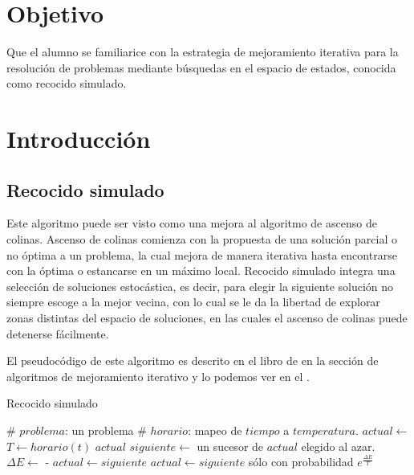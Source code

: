 \section{Objetivo}

Que el alumno se familiarice con la estrategia de mejoramiento iterativa para la resolución de problemas mediante búsquedas en el espacio de estados, conocida como recocido simulado.



\section{Introducción}

\subsection{Recocido simulado}

Este algoritmo puede ser visto como una mejora al algoritmo de ascenso de colinas.  Ascenso de colinas comienza con la propuesta de una solución parcial o no óptima a un problema, la cual mejora de manera iterativa hasta encontrarse con la óptima o estancarse en un máximo local.  Recocido simulado integra una selección de soluciones estocástica, es decir, para elegir la siguiente solución no siempre escoge a la mejor vecina, con lo cual se le da la libertad de explorar zonas distintas del espacio de soluciones, en las cuales el ascenso de colinas puede detenerse fácilmente.

El pseudocódigo de este algoritmo es descrito en el libro de  \cite{Russell2010} en la sección de algoritmos de mejoramiento iterativo y lo podemos ver en el .

\begin{algorithm}
 \caption{Recocido simulado}\label{alg:annealing}
 \begin{algorithmic}
    \State \# $problema$: un problema
    \State \# $horario$: mapeo de $tiempo$ a $temperatura$.
    \State $actual \leftarrow $ 
      \State $T \leftarrow horario(t)$
        \State \Return $actual$
      \EndIf
      \State $siguiente \leftarrow$ un sucesor de $actual$ elegido al azar.
      \State $\Delta E \leftarrow$  - 
        \State $actual \leftarrow siguiente$
      \Else
        \State $actual \leftarrow siguiente$ sólo con probabilidad $e^{\frac{\Delta E}{T}}$
      \EndIf
    \EndFor
  \EndFunction
 \end{algorithmic}
\end{algorithm}



